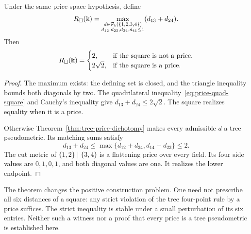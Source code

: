 \begin{corollary}
\label{cor:tree-price-objective}
Under the same price-space hypothesis, define
\[
R_\square(\Bbbk)=
\max_{\substack{d\in\mathcal P_\Bbbk(\{1,2,3,4\})\\
d_{12},d_{23},d_{34},d_{41}\le1}}(d_{13}+d_{24}).
\]
Then
\[
R_\square(\Bbbk)=
\begin{cases}
2,&\text{if the square is not a price},\\
2\sqrt2,&\text{if the square is a price}.
\end{cases}
\]
\end{corollary}

\begin{proof}
The maximum exists: the defining set is closed, and the triangle
inequality bounds both diagonals by two.  The quadrilateral
inequality~\eqref{eq:price-quad-square} and Cauchy's inequality give
$d_{13}+d_{24}\le2\sqrt2$.  The square realizes equality when it is
a price.

Otherwise Theorem~\ref{thm:tree-price-dichotomy} makes every
admissible $d$ a tree pseudometric.  Its matching sums satisfy
\[
d_{13}+d_{24}\le
\max\{d_{12}+d_{34},d_{14}+d_{23}\}\le2.
\]
The cut metric of $\{1,2\}\mid\{3,4\}$ is a flattening price over
every field.  Its four side values are $0,1,0,1$, and both diagonal
values are one.  It realizes the lower endpoint.
\end{proof}

The theorem changes the positive construction problem.  One need
not prescribe all six distances of a square: any strict violation
of the tree four-point rule by a price suffices.  The strict
inequality is stable under a small perturbation of its six entries.
Neither such a witness nor a proof that every price is a tree
pseudometric is established here.

